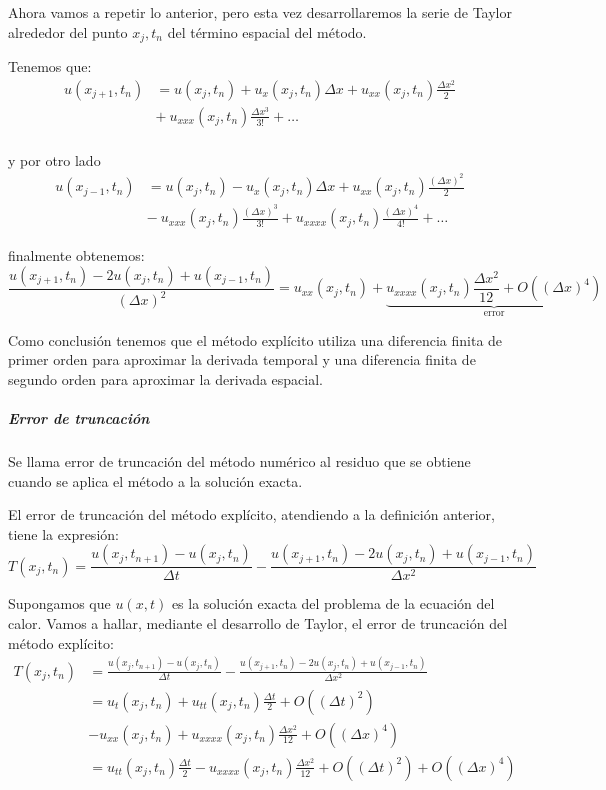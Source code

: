 Ahora vamos a repetir lo anterior, pero esta vez desarrollaremos la serie de Taylor alrededor del punto $x_j, t_n$ del término espacial del método. 

Tenemos que:
\begin{align*}
u(x_{j+1}, t_n) &= u(x_j,t_n) + u_x(x_j,t_n)\Delta x + u_{xx}(x_j,t_n)\frac{\Delta x^2}{2}\\ &+\  u_{xxx}(x_j,t_n)\frac{\Delta x^3}{3!}  + \hdots\\
\end{align*}

y por otro lado
\begin{align*}
u(x_{j-1},t_n) &= u(x_j, t_n) - u_x(x_j,t_n)\Delta x + u_{xx}(x_j,t_n)\frac{(\Delta x)^2}{2}\\ &-\ u_{xxx}(x_j, t_n)\frac{(\Delta x)^3}{3!} + u_{xxxx}(x_j,t_n)\frac{(\Delta x)^4}{4!} + \hdots
\end{align*}

finalmente obtenemos:
$$\frac{u(x_{j+1}, t_n) - 2u(x_j,t_n) + u(x_{j-1},t_n)}{(\Delta x)^2} = u_{xx}(x_j,t_n) + \underbrace{ u_{xxxx}(x_j, t_n)\frac{\Delta x^2}{12} + O\left((\Delta x)^4\right)}_{\text{error}}$$

Como conclusión tenemos que el método explícito utiliza una diferencia finita de primer orden para aproximar la derivada temporal y una diferencia finita de segundo orden para aproximar la derivada espacial.

\subparagraph{Error de truncación}\mbox{}

\begin{defn}
Se llama error de truncación del método numérico al residuo que se obtiene cuando se aplica el método a la solución exacta.
\end{defn}

El error de truncación del método explícito, atendiendo a la definición anterior, tiene la expresión:
$$T(x_j,t_n) = \frac{u(x_j,t_{n+1})-u(x_j,t_n)}{\Delta t} - \frac{u(x_{j+1},t_n)-2u(x_j,t_n)+u(x_{j-1},t_n)}{\Delta x^2}$$

Supongamos que $u(x,t)$ es la solución exacta del problema de la ecuación del calor. Vamos a hallar, mediante el desarrollo de Taylor, el error de truncación del método explícito:
\begin{align*}
T(x_j,t_n) &= \frac{u(x_j,t_{n+1})-u(x_j,t_n)}{\Delta t} - \frac{u(x_{j+1},t_n)-2u(x_j,t_n)+u(x_{j-1},t_n)}{\Delta x^2}\\ 
& =  u_t(x_j,t_n) + u_{tt}(x_j,t_n)\frac{\Delta t}{2} + O \left((\Delta t)^2\right) \\
& - u_{xx}(x_j,t_n) + u_{xxxx}(x_j,t_n)\frac{\Delta x^2}{12} + O\left((\Delta x)^4\right)\\ 
& =  u_{tt}(x_j,t_n)\frac{\Delta t}{2} -  u_{xxxx}(x_j,t_n)\frac{\Delta x^2}{12} + O\left((\Delta t)^2\right) + O\left((\Delta x)^4\right)
\end{align*}

